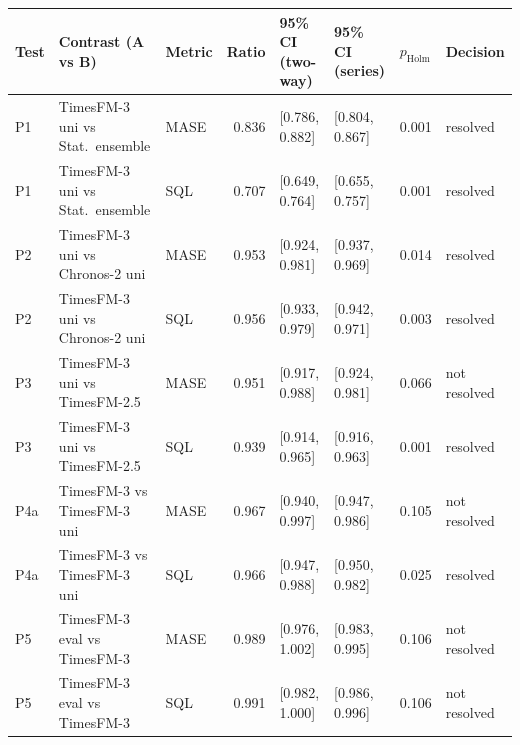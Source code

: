 \begin{tabular}{lllrllll}
\toprule
Test & Contrast (A vs B) & Metric & Ratio & 95\% CI (two-way) & 95\% CI (series) & $p_{\mathrm{Holm}}$ & Decision \\
\midrule
P1 & TimesFM-3 uni vs Stat.\ ensemble & MASE & 0.836 & [0.786, 0.882] & [0.804, 0.867] & 0.001 & resolved \\
P1 & TimesFM-3 uni vs Stat.\ ensemble & SQL & 0.707 & [0.649, 0.764] & [0.655, 0.757] & 0.001 & resolved \\
P2 & TimesFM-3 uni vs Chronos-2 uni & MASE & 0.953 & [0.924, 0.981] & [0.937, 0.969] & 0.014 & resolved \\
P2 & TimesFM-3 uni vs Chronos-2 uni & SQL & 0.956 & [0.933, 0.979] & [0.942, 0.971] & 0.003 & resolved \\
P3 & TimesFM-3 uni vs TimesFM-2.5 & MASE & 0.951 & [0.917, 0.988] & [0.924, 0.981] & 0.066 & not resolved \\
P3 & TimesFM-3 uni vs TimesFM-2.5 & SQL & 0.939 & [0.914, 0.965] & [0.916, 0.963] & 0.001 & resolved \\
P4a & TimesFM-3 vs TimesFM-3 uni & MASE & 0.967 & [0.940, 0.997] & [0.947, 0.986] & 0.105 & not resolved \\
P4a & TimesFM-3 vs TimesFM-3 uni & SQL & 0.966 & [0.947, 0.988] & [0.950, 0.982] & 0.025 & resolved \\
P5 & TimesFM-3 eval vs TimesFM-3 & MASE & 0.989 & [0.976, 1.002] & [0.983, 0.995] & 0.106 & not resolved \\
P5 & TimesFM-3 eval vs TimesFM-3 & SQL & 0.991 & [0.982, 1.000] & [0.986, 0.996] & 0.106 & not resolved \\
\bottomrule
\end{tabular}
